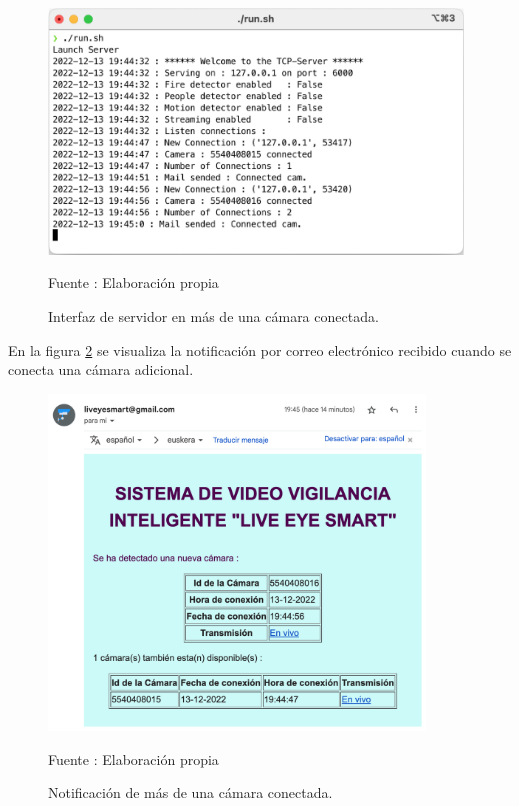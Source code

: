 \begin{figure}[H]
    \begin{center}
        \includegraphics[width=11cm]{img/capitulo_6/server_cam_connected_more_cams.png}
    \end{center}
    \begin{center}
        \caption{Interfaz de servidor en más de una cámara conectada.}
        Fuente : Elaboración propia
        \label{n_cameras_connected}
    \end{center}
\end{figure}

En la figura \ref{notif_mail_n_cameras} se visualiza la notificación por correo electrónico recibido cuando se conecta una cámara adicional.

\begin{figure}[H]
    \begin{center}
        \includegraphics[width=10cm]{img/capitulo_6/mail2.png}
    \end{center}
    \begin{center}
        \caption{Notificación de más de una cámara conectada.}
        Fuente : Elaboración propia
        \label{notif_mail_n_cameras}
    \end{center}
\end{figure}

